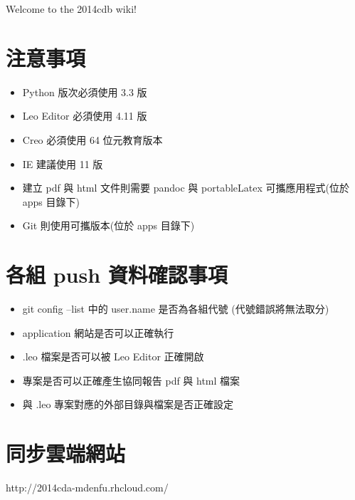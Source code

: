 \documentclass[]{article}
\begin{document}
Welcome to the 2014cdb wiki!

\section{注意事項}\label{ux6ce8ux610fux4e8bux9805}

\begin{itemize}
\itemsep1pt\parskip0pt
\item
  Python 版次必須使用 3.3 版
\item
  Leo Editor 必須使用 4.11 版
\item
  Creo 必須使用 64 位元教育版本
\item
  IE 建議使用 11 版
\item
  建立 pdf 與 html 文件則需要 pandoc 與 portableLatex 可攜應用程式(位於
  apps 目錄下)
\item
  Git 則使用可攜版本(位於 apps 目錄下)
\end{itemize}

\section{各組 push
資料確認事項}\label{ux5404ux7d44-push-ux8cc7ux6599ux78baux8a8dux4e8bux9805}

\begin{itemize}
\itemsep1pt\parskip0pt
\item
  git config --list 中的 user.name 是否為各組代號 (代號錯誤將無法取分)
\item
  application 網站是否可以正確執行
\item
  .leo 檔案是否可以被 Leo Editor 正確開啟
\item
  專案是否可以正確產生協同報告 pdf 與 html 檔案
\item
  與 .leo 專案對應的外部目錄與檔案是否正確設定
\end{itemize}

\section{同步雲端網站}\label{ux540cux6b65ux96f2ux7aefux7db2ux7ad9}

http://2014cda-mdenfu.rhcloud.com/

\end{document}
